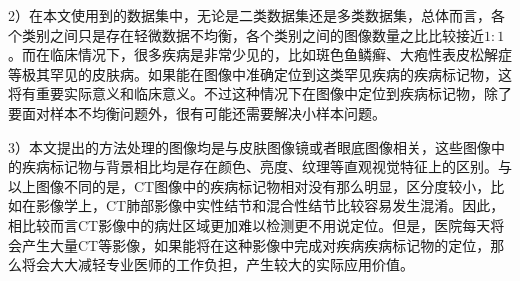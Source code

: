 2）在本文使用到的数据集中，无论是二类数据集还是多类数据集，总体而言，各个类别之间只是存在轻微数据不均衡，各个类别之间的图像数量之比比较接近$1:1$。而在临床情况下，很多疾病是非常少见的，比如斑色鱼鳞癣、大疱性表皮松解症等极其罕见的皮肤病。如果能在图像中准确定位到这类罕见疾病的疾病标记物，这将有重要实际意义和临床意义。不过这种情况下在图像中定位到疾病标记物，除了要面对样本不均衡问题外，很有可能还需要解决小样本问题。

3）本文提出的方法处理的图像均是与皮肤图像镜或者眼底图像相关，这些图像中的疾病标记物与背景相比均是存在颜色、亮度、纹理等直观视觉特征上的区别。与以上图像不同的是，CT图像中的疾病标记物相对没有那么明显，区分度较小，比如在影像学上，CT肺部影像中实性结节和混合性结节比较容易发生混淆。因此，相比较而言CT影像中的病灶区域更加难以检测更不用说定位。但是，医院每天将会产生大量CT等影像，如果能将在这种影像中完成对疾病疾病标记物的定位，那么将会大大减轻专业医师的工作负担，产生较大的实际应用价值。

